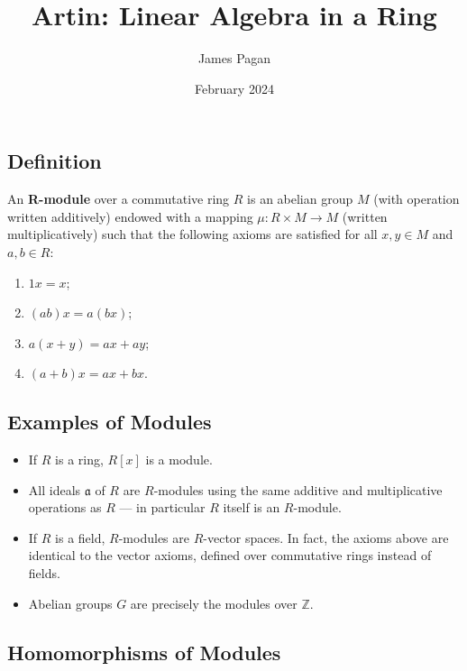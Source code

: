 \documentclass[11pt]{article}
\title{Artin: Linear Algebra in a Ring}
\author{James Pagan}
\date{February 2024}
\begin{document}
\maketitle
\tableofcontents
\newpage


\subsection{Definition}

An \textbf{R-module} over a commutative ring $R$ is an abelian group $M$ (with operation written additively) endowed with a mapping $\mu : R \times M \to M$ (written multiplicatively) such that the following axioms are satisfied for all $x, y \in M$ and $a, b \in R$:
\begin{enumerate}
	\item $1x = x$;
	\item $(ab)x = a(bx)$;
	\item $a(x + y) = ax + ay$;
	\item $(a + b)x = ax + bx$.
\end{enumerate}


\subsection{Examples of Modules}

\begin{itemize}
	\item If $R$ is a ring, $R[x]$ is a module.
	\item All ideals $\mathfrak{a}$ of $R$ are $R$-modules using the same additive and multiplicative operations as $R$ --- in particular $R$ itself is an $R$-module.
	\item If $R$ is a field, $R$-modules are $R$-vector spaces. In fact, the axioms above are identical to the vector axioms, defined over commutative rings instead of fields.
	\item Abelian groups $G$ are precisely the modules over $\mathbb{Z}$.
\end{itemize}


\subsection{Homomorphisms of Modules}
\end{document}
